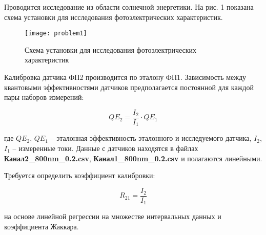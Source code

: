 Проводится исследование из области солнечной энергетики. На рис. 1 показана схема установки для исследования фотоэлектрических характеристик.

\begin{figure}[H]
	\begin{center}
		\texttt{[image: problem1]}
		\label{pic:problem1}
		\caption{Схема установки для исследования фотоэлектрических характеристик}
	\end{center}
\end{figure}

Калибровка датчика ФП2 производится по эталону ФП1. Зависимость между квантовыми эффективностями датчиков предполагается постоянной для каждой пары наборов измерений:

\begin{equation}
	QE_2 = \frac{I_2}{I_1} \cdot QE_1
\end{equation}

где $QE_2$, $QE_1$ -- эталонная эффективность эталонного и исследуемого датчика, $I_2$, $I_1$ -- измеренные токи. Данные с датчиков находятся в файлах \textbf{Канал2\_800nm\_0.2.csv}, \textbf{Канал1\_800nm\_0.2.csv} и полагаются линейными.

Требуется определить коэффициент калибровки:

\begin{equation}
R_{21} = \frac{I_2}{I_1}
\end{equation}

на основе линейной регрессии на множестве интервальных данных и коэффициента Жаккара.